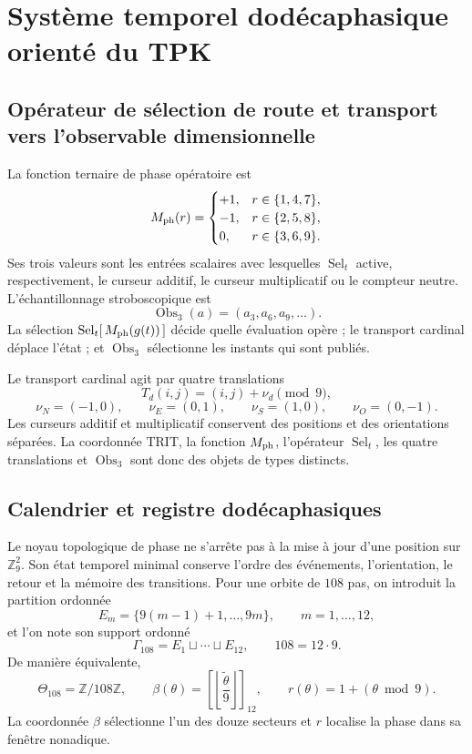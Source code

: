 \section{Système temporel dodécaphasique orienté du TPK}
\label{sec:ciclo-dodecafasico-tpk-rev7}


\subsection{Opérateur de sélection de route et transport vers l'observable dimensionnelle}

La fonction ternaire de phase opératoire est
\[
M_{\rm ph}(r)=
\begin{cases}
 +1,&r\in\{1,4,7\},\\
 -1,&r\in\{2,5,8\},\\
 0,&r\in\{3,6,9\}.
\end{cases}
\]
Ses trois valeurs sont les entrées scalaires avec lesquelles
\(\operatorname{Sel}_t\) active, respectivement, le curseur additif, le
curseur multiplicatif ou le compteur neutre. L'échantillonnage stroboscopique est
\[
 \operatorname{Obs}_3(a)=(a_3,a_6,a_9,\ldots).
\]
La sélection \(\operatorname{Sel}_t[\,M_{\rm ph}(g(t))\,]\) décide quelle
évaluation opère ; le transport cardinal déplace l'état ; et
\(\operatorname{Obs}_3\) sélectionne les instants qui sont publiés.

Le transport cardinal agit par quatre translations
\[
 T_d(i,j)=(i,j)+\nu_d\pmod9,
\]
\[
 \nu_N=(-1,0),\qquad \nu_E=(0,1),\qquad
 \nu_S=(1,0),\qquad \nu_O=(0,-1).
\]
Les curseurs additif et multiplicatif conservent des positions et des orientations
séparées. La coordonnée TRIT, la fonction \(M_{\rm ph}\), l'opérateur
\(\operatorname{Sel}_t\), les quatre translations et
\(\operatorname{Obs}_3\) sont donc des objets de types distincts.

\subsection{Calendrier et registre dodécaphasiques}

Le noyau topologique de phase ne s'arrête pas à la mise à jour d'une position
sur \(\mathbb Z_9^2\). Son état temporel minimal conserve l'ordre des
événements, l'orientation, le retour et la mémoire des transitions. Pour
une orbite de \(108\) pas, on introduit la partition ordonnée
\[
 E_m=\{9(m-1)+1,\ldots,9m\},
 \qquad m=1,\ldots,12,
\]
et l'on note son support ordonné
\[
 \Gamma_{108}=E_1\sqcup\cdots\sqcup E_{12},
 \qquad 108=12\cdot9.
\]
De manière équivalente,
\[
 \Theta_{108}=\mathbb Z/108\mathbb Z,\qquad
 \beta(\theta)=
 \left[\left\lfloor\frac{\widetilde\theta}{9}\right\rfloor\right]_{12},
 \qquad
 r(\theta)=1+(\theta\bmod9).
\]
La coordonnée \(\beta\) sélectionne l'un des douze secteurs et \(r\) localise la
phase dans sa fenêtre nonadique.

